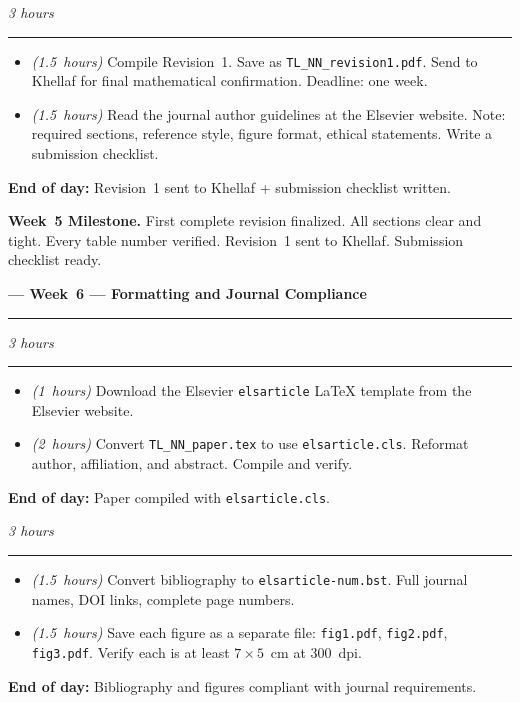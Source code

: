 \documentclass[12pt,a4paper]{article}
\newcommand{\hrs}[1]{\textit{\color{darkgray}(#1~hours)}}
\newcommand{\weekheading}[2]{%
  \vspace{0.8em}
  \noindent
  {\large\bfseries\color{midblue}--- Week~#1 ---
  \hfill\normalsize\normalfont\color{darkgray}#2}
  \vspace{0.2em}
  \\{\color{midblue}\rule{\linewidth}{0.6pt}}
  \vspace{0.3em}
}
\newcommand{\dayheading}[2]{%
  \vspace{0.3em}
  \noindent{\bfseries\color{darkblue}Day~#1}%
  \hfill{\small\color{darkgray}\textit{#2}}%
  \\[-0.4em]{\color{midgray}\rule{\linewidth}{0.4pt}}%
  \vspace{0.1em}
}
\begin{document}
\begin{tcolorbox}[daystyle]
\dayheading{35}{3 hours}
\begin{itemize}[leftmargin=1.8em,itemsep=3pt]
  \item[\color{midblue}$\bullet$]
    \hrs{1.5} Compile Revision~1. Save as
    \texttt{TL\_NN\_revision1.pdf}. Send to Khellaf
    for final mathematical confirmation. Deadline: one week.
  \item[\color{midblue}$\bullet$]
    \hrs{1.5} Read the journal author guidelines at the
    Elsevier website. Note: required sections, reference
    style, figure format, ethical statements.
    Write a submission checklist.
\end{itemize}
\noindent\textbf{End of day:}
Revision~1 sent to Khellaf + submission checklist written.
\end{tcolorbox}

\begin{tcolorbox}[milestonestyle]
\noindent\textbf{\color{darkred}Week~5 Milestone.}
First complete revision finalized. All sections clear and
tight. Every table number verified. Revision~1 sent to
Khellaf. Submission checklist ready.
\end{tcolorbox}

\weekheading{6}{Formatting and Journal Compliance}

\begin{tcolorbox}[daystyle]
\dayheading{36}{3 hours}
\begin{itemize}[leftmargin=1.8em,itemsep=3pt]
  \item[\color{midblue}$\bullet$]
    \hrs{1} Download the Elsevier \texttt{elsarticle}
    \LaTeX{} template from the Elsevier website.
  \item[\color{midblue}$\bullet$]
    \hrs{2} Convert \texttt{TL\_NN\_paper.tex} to use
    \texttt{elsarticle.cls}. Reformat author, affiliation,
    and abstract. Compile and verify.
\end{itemize}
\noindent\textbf{End of day:}
Paper compiled with \texttt{elsarticle.cls}.
\end{tcolorbox}

\begin{tcolorbox}[daystyle]
\dayheading{37}{3 hours}
\begin{itemize}[leftmargin=1.8em,itemsep=3pt]
  \item[\color{midblue}$\bullet$]
    \hrs{1.5} Convert bibliography to
    \texttt{elsarticle-num.bst}. Full journal names,
    DOI links, complete page numbers.
  \item[\color{midblue}$\bullet$]
    \hrs{1.5} Save each figure as a separate file:
    \texttt{fig1.pdf}, \texttt{fig2.pdf}, \texttt{fig3.pdf}.
    Verify each is at least $7 \times 5$~cm at 300~dpi.
\end{itemize}
\noindent\textbf{End of day:}
Bibliography and figures compliant with journal requirements.
\end{tcolorbox}
\end{document}
